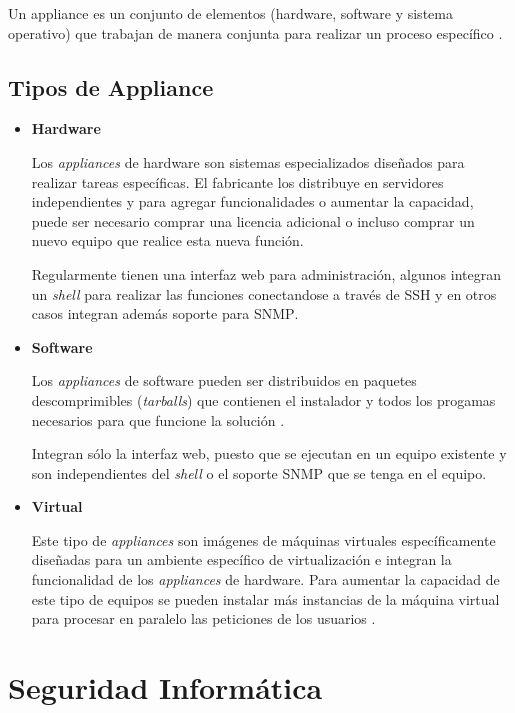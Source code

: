 Un appliance es un conjunto de elementos (hardware, software y sistema operativo) que trabajan de manera conjunta para realizar un proceso espec\'{i}fico \cite{smith_linux_2007}.

    \subsection{Tipos de Appliance}

\begin{itemize}

  \item \textbf{Hardware}

Los \textit{appliances} de hardware son sistemas especializados dise\~{n}ados para realizar tareas espec\'{i}ficas. El fabricante los distribuye en servidores independientes y para agregar funcionalidades o aumentar la capacidad, puede ser necesario comprar una licencia adicional o incluso comprar un nuevo equipo que realice esta nueva funci\'{o}n.

Regularmente tienen una interfaz web para administraci\'{o}n, algunos integran un \textit{shell} para realizar las funciones conectandose a trav\'{e}s de \textsc{SSH} y en otros casos integran adem\'{a}s soporte para \textsc{SNMP}.

\newpage
  \item \textbf{Software}

Los \textit{appliances} de software pueden ser distribuidos en paquetes descomprimibles (\textit{tarballs}) que contienen el instalador y todos los progamas necesarios para que funcione la soluci\'{o}n \cite{_bitnami:_????}.

Integran s\'{o}lo la interfaz web, puesto que se ejecutan en un equipo existente y son independientes del \textit{shell} o el soporte \textsc{SNMP} que se tenga en el equipo.

  \item \textbf{Virtual}

Este tipo de \textit{appliances} son im\'{a}genes de m\'{a}quinas virtuales espec\'{i}ficamente dise\~{n}adas para un ambiente espec\'{i}fico de virtualizaci\'{o}n e integran la funcionalidad de los \textit{appliances} de hardware. Para aumentar la capacidad de este tipo de equipos se pueden instalar m\'{a}s instancias de la m\'{a}quina virtual para procesar en paralelo las peticiones de los usuarios \cite{_why_????}.

\end{itemize}

\section {Seguridad Inform\'{a}tica}

